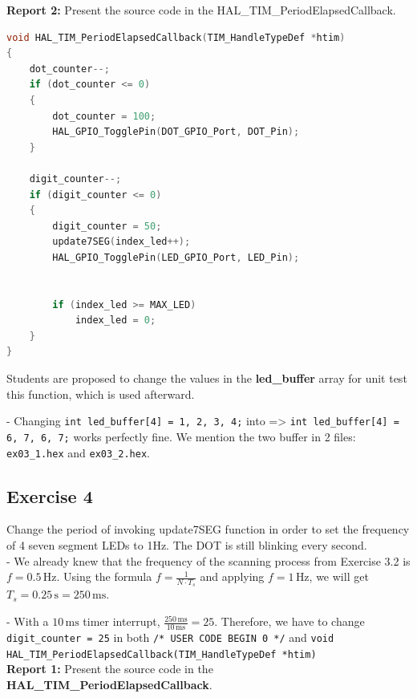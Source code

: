 \textbf{Report 2: } Present the source code in the HAL\_TIM\_PeriodElapsedCallback.\\

\begin{lstlisting}[language=c,caption={Source code in the HAL\_TIM\_PeriodElapsedCallback function.}]
void HAL_TIM_PeriodElapsedCallback(TIM_HandleTypeDef *htim)
{
    dot_counter--;
    if (dot_counter <= 0)
    {
        dot_counter = 100;
        HAL_GPIO_TogglePin(DOT_GPIO_Port, DOT_Pin);
    }

    digit_counter--;
    if (digit_counter <= 0)
    {
        digit_counter = 50;
        update7SEG(index_led++);
        HAL_GPIO_TogglePin(LED_GPIO_Port, LED_Pin);


        if (index_led >= MAX_LED)
            index_led = 0;
    }
}
\end{lstlisting}

Students are proposed to change the values in the \textbf{led\_buffer} array for unit test this function, which is used afterward.

- Changing \texttt{int led\_buffer[4] = {1, 2, 3, 4};} into => \texttt{int led\_buffer[4] = {6, 7, 6, 7};} works perfectly fine. We mention the two buffer in 2 files: \texttt{ex03\_1.hex} and \texttt{ex03\_2.hex}.










\subsection{Exercise 4}
Change the period of invoking update7SEG function in order to set the frequency of 4 seven segment LEDs to 1Hz. The DOT is still blinking every second.\\

- We already knew that the frequency of the scanning process from Exercise 3.2 is $f = 0.5\,\text{Hz}$. Using the formula $f = \frac{1}{N \cdot T_s}$ and applying $f = 1\,\text{Hz}$, we will get $T_s = 0.25\,\text{s} = 250\, \text{ms}$.

- With a $10\, \text{ms}$ timer interrupt, $\frac{250\, \text{ms}}{10\, \text{ms}} = 25$. Therefore, we have to change \texttt{digit\_counter = 25} in both \texttt{/* USER CODE BEGIN 0 */} and \texttt{void HAL\_TIM\_PeriodElapsedCallback(TIM\_HandleTypeDef *htim){}} \\

\textbf{Report 1: } Present the source code in the \textbf{HAL\_TIM\_PeriodElapsedCallback}. \\

